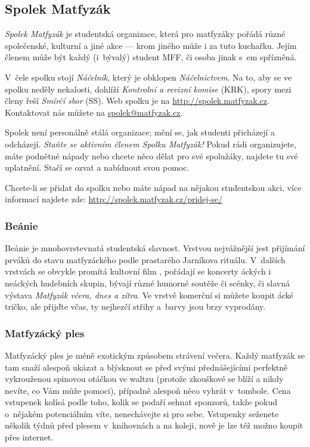 \subsection{Spolek Matfyzák}

{\it Spolek Matfyzák\/} je studentská organizace, která pro matfyzáky pořádá různé spo\-le\-čen\-ské, kulturní a jiné akce --- krom jiného může i za tuto kuchařku.
Jejím členem může být každý
(i~bývalý) student MFF, či osoba jinak s~\mfz{}em spřízněná.


V~čele spolku stojí {\it Náčelník}, který je obklopen {\it
Náčelnictvem}. Na to, aby se ve spolku neděly nekalosti, dohlíží
{\it Kontrolní a revizní komise} (KRK), spory mezi členy řeší {\it
Smírčí sbor} (SS). Web spolku je na \url{http://spolek.matfyzak.cz}. Kontaktovat nás můžete na \url{spolek@matfyzak.cz}.

Spolek není personálně stálá
organizace; mění se, jak studenti přicházejí a od\-chá\-zejí. {\it
Staňte se aktivním členem Spolku Matfyzák!} Pokud rádi
organizujete, máte podnětné nápady nebo chcete něco dělat pro své
spolužáky, najdete tu své uplatnění. Stačí se ozvat a nabídnout
svou pomoc.

Chcete-li se přidat do spolku nebo máte nápad na nějakou studentskou akci, více informací najdete zde: \url{http://spolek.matfyzak.cz/pridej-se/}


\subsubsection{Beánie}

Beánie je mnohovrstevnatá studentská slavnost. Vrstvou nejvážnější jest
přijímání prváků do stavu matfyzáckého podle prastarého Jarníkova
rituálu. V~dalších vrstvách se obvykle promítá kultovní film
\Mfk{}, pořádají se koncerty \mfz{}áckých i ne\mfz{}áckých hudebních
skupin, bývají různé humorné soutěže či scénky, či slavná výstava
{\it Matfyzák včera, dnes a zítra}. Ve vrstvě komerční si můžete
koupit \mfz{}ácké tričko, ale přijďte včas, ty nejhezčí střihy
a~barvy jsou brzy vyprodány.

\subsubsection{Matfyzácký ples}

Matfyzácký ples je méně exotickým způsobem strávení večera. Každý matfyzák se tam snaží alespoň ukázat a blýsknout se
před svými přednášejícími perfektně vykrouženou spinovou otáčkou
ve waltzu (protože zkouškové se blíží a nikdy nevíte, co Vám může
pomoci), případně alespoň něco vyhrát v~tombole. Cena vstupenek
kolísá podle toho, kolik se podaří sehnat sponzorů, takže pokud
o~nějakém potenciálním víte, nenechávejte si pro sebe. Vstupenky
seženete několik týdnů před plesem v~knihovnách a na koleji, nově je lze též možno koupit přes internet.


